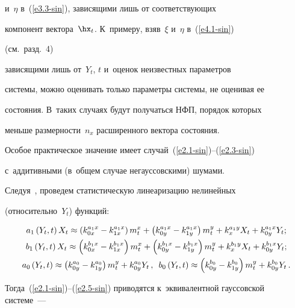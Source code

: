 и~$\eta$ в~(\ref{e3.3-sin}), зависящими лишь от соответствующих


компонент вектора~$\hx_t$. К~примеру, взяв~$\xi$ и~$\eta$ в~(\ref{e4.1-sin})


 (см.\ разд.~4)


зависящими лишь от~$Y_t$, $t$ и~оценок неизвестных параметров


системы, можно оценивать только параметры системы, не оценивая ее


состояния. В~таких случаях будут получаться НФП, порядок которых


меньше размерности~$n_x$ расширенного вектора состояния.





Особое практическое значение имеет случай~(\ref{e2.1-sin})--(\ref{e2.3-sin}) 


с~аддитивными (в~общем случае негауссовскими) шумами.


Следуя~\cite{2-sin}, проведем статистическую линеаризацию нелинейных 


(относительно~$Y_t$) функций:


\begin{gather*}


a_1 \left(Y_t, t\right) X_t \approx \left(k_{0x}^{a_1 x} - k_{1x}^{a_1 x}\right) 


m_t^x + \left( k_{0y}^{a_1 x} - k_{1y}^{a_1 x}\right) 


m_t^y + k_x^{a_1 y} X_t + k_{0y}^{a_1 x} Y_t;\\


b_1 \left(Y_t, t\right) X_t \approx \left(k_{0x}^{b_1 x} - k_{1x}^{b_1 x}\right) m_t^x 


+ \left( k_{0y}^{b_1 x} - k_{1y}^{b_1 x}\right) m_t^y + 


k_x^{b_1 y} X_t + k_{0y}^{b_1 x} Y_t;\\


a_0 \left(Y_t , t\right) \approx \left( k_{0y}^{a_0} - k_{1y}^{a_0}\right) m_t^y + 


k_{0y}^{a_0} Y_t\,, \enskip b_0 \left(Y_t , t\right) \approx 


\left( k_{0y}^{b_0} - k_{1y}^{b_0}\right) m_t^y +


 k_{0y}^{b_0} Y_t\,.


 \end{gather*}


Тогда~(\ref{e2.1-sin})--(\ref{e2.5-sin}) приводятся к~эквивалентной гауссовской системе~---


